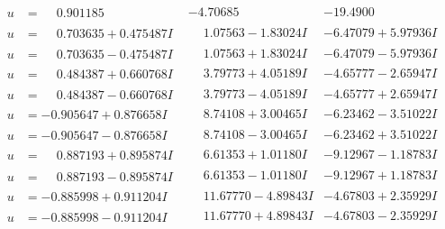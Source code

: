 \documentclass[1p]{elsarticle_modified}
\theoremstyle{definition}
\begin{document}
$$\begin{array}{c|c|c}
\begin{aligned}
u &= \phantom{-}0.901185\phantom{ +0.000000I}\end{aligned}
 & -4.70685\phantom{ +0.000000I} & -19.4900\phantom{ +0.000000I} \\ \hline\begin{aligned}
u &= \phantom{-}0.703635 + 0.475487 I\end{aligned}
 & \phantom{-}1.07563 - 1.83024 I & -6.47079 + 5.97936 I \\ \hline\begin{aligned}
u &= \phantom{-}0.703635 - 0.475487 I\end{aligned}
 & \phantom{-}1.07563 + 1.83024 I & -6.47079 - 5.97936 I \\ \hline\begin{aligned}
u &= \phantom{-}0.484387 + 0.660768 I\end{aligned}
 & \phantom{-}3.79773 + 4.05189 I & -4.65777 - 2.65947 I \\ \hline\begin{aligned}
u &= \phantom{-}0.484387 - 0.660768 I\end{aligned}
 & \phantom{-}3.79773 - 4.05189 I & -4.65777 + 2.65947 I \\ \hline\begin{aligned}
u &= -0.905647 + 0.876658 I\end{aligned}
 & \phantom{-}8.74108 + 3.00465 I & -6.23462 - 3.51022 I \\ \hline\begin{aligned}
u &= -0.905647 - 0.876658 I\end{aligned}
 & \phantom{-}8.74108 - 3.00465 I & -6.23462 + 3.51022 I \\ \hline\begin{aligned}
u &= \phantom{-}0.887193 + 0.895874 I\end{aligned}
 & \phantom{-}6.61353 + 1.01180 I & -9.12967 - 1.18783 I \\ \hline\begin{aligned}
u &= \phantom{-}0.887193 - 0.895874 I\end{aligned}
 & \phantom{-}6.61353 - 1.01180 I & -9.12967 + 1.18783 I \\ \hline\begin{aligned}
u &= -0.885998 + 0.911204 I\end{aligned}
 & \phantom{-}11.67770 - 4.89843 I & -4.67803 + 2.35929 I \\ \hline\begin{aligned}
u &= -0.885998 - 0.911204 I\end{aligned}
 & \phantom{-}11.67770 + 4.89843 I & -4.67803 - 2.35929 I \\ \hline\begin{aligned}

\end{aligned}
\end{array}$$
\end{document}
